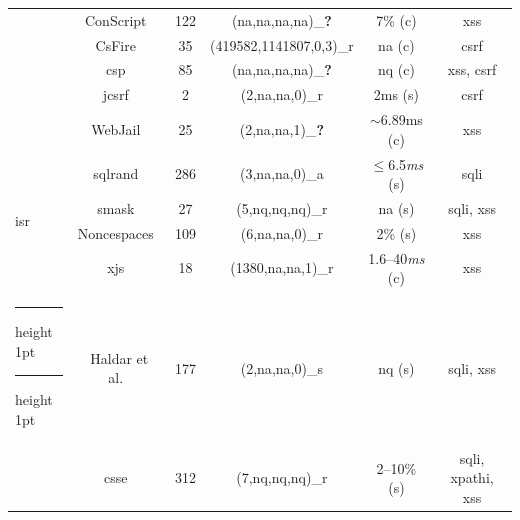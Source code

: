 \documentclass[10pt,journal,compsoc]{IEEEtran}
\makeatletter
\newcommand{\tick}{\ding{52}}
\newcommand{\xmark}{\ding{56}}
\newcommand{\thickhline}{%
    \noalign {\ifnum 0=`}\fi \hrule height 1pt
    \futurelet \reserved@a \@xhline
}
\makeatother
\begin{document}
\begin{table}[t]
\begin{threeparttable}
\begin{small}
{\begin{tabular}{l|c|c|cc|c}
  &   ConScript~\cite{ML10} & 122 & ({\sc na},{\sc na},{\sc na},{\sc na})\_{\bf ?} & 7\% ({\sc c}) & {\sc xss} \\
  &   CsFire~\cite{DDHPJ10} & 35 & (419582,1141807,0,3)\_r\tnote{5} & {\sc na} ({\sc c}) & {\sc csrf} \\
  &   {\sc csp}~\cite{SSM10} & 85 & ({\sc na},{\sc na},{\sc na},{\sc na})\_{\bf ?} & {\sc nq} ({\sc c}) & {\sc xss}, {\sc csrf} \\
  &   j{\sc csrf}~\cite{PS11} & 2 & (2,{\sc na},{\sc na},0)\_r & 2ms ({\sc s}) & {\sc csrf} \\
  &   WebJail~\cite{VDDPJ11} & 25 & (2,{\sc na},{\sc na},1)\_{\bf ?} & $\sim$6.89ms ({\sc c}) & {\sc xss} \\
  \hline
  \multirow{4}{*}{{\sc isr}}
  &   {\sc sql}rand~\cite{BK04} & 286 & (3,{\sc na},{\sc na},0)\_a & $\le$6.5{\it ms} ({\sc s}) & {\sc sql}i \\
  &   {\sc sm}ask~\cite{JB07} & 27 & (5,{\sc nq},{\sc nq},{\sc nq})\_r  & {\sc na} ({\sc s}) & {\sc sql}i, {\sc xss} \\
  &   Noncespaces~\cite{GC09} & 109 & (6,{\sc na},{\sc na},0)\_r &  2\% ({\sc s}) & {\sc xss} \\ 
  &   x{\sc js}~\cite{APKLM10} & 18 & (1380,{\sc na},{\sc na},1)\_r & 1.6--40{\it ms} ({\sc c}) & {\sc xss} \\
  \thickhline
  \thickhline
  \multirow{7}{*}{Taint Tracking}
  &   Haldar et al.~\cite{HCF05} & 177 & (2,{\sc na},{\sc na},0)\_s & {\sc nq} ({\sc s}) & {\sc sql}i, {\sc xss} \\ 
  &   {\sc csse}~\cite{PB05} & 312 & (7,{\sc nq},{\sc nq},{\sc nq})\_r & 2--10\% ({\sc s}) & {\sc sql}i, {\sc xp}athi, {\sc xss} \\

\end{tabular}}
\end{small}
\end{threeparttable}
\end{table}
\end{document}
